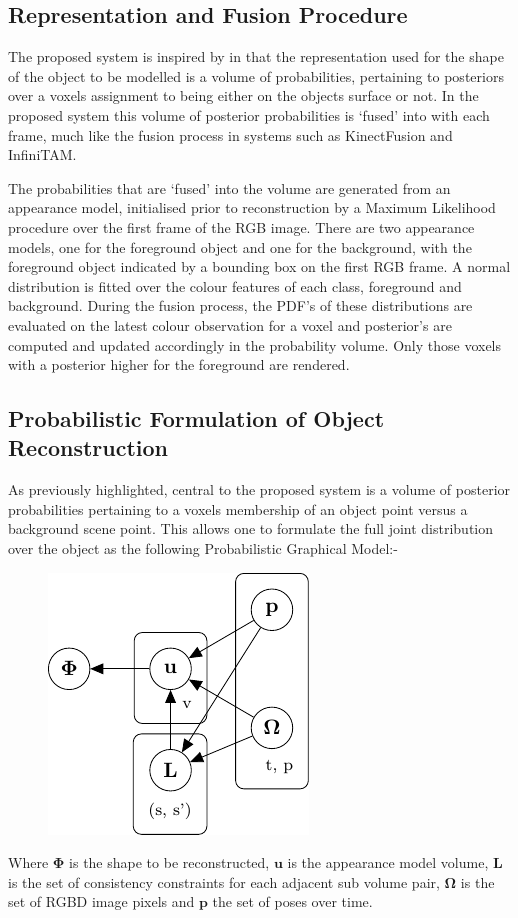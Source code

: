 \subsection{Representation and Fusion Procedure}
The proposed system is inspired by\cite{Kolev2006} in that the representation used for the shape of the object to be modelled is a volume 
of probabilities, pertaining to posteriors over a voxels assignment to being either on the objects surface or not. In the proposed system this 
volume of posterior probabilities is `fused' into with each frame, much like the fusion process in systems such as KinectFusion\cite{Newcombe2011} 
and InfiniTAM\cite{Prisacariu2014}.

The probabilities that are `fused' into the volume are generated from an appearance model, initialised prior to reconstruction by a Maximum 
Likelihood procedure over the first frame of the RGB image. There are two appearance models, one for the foreground object and one for 
the background, with the foreground object indicated by a bounding box on the first RGB frame. A normal distribution is fitted over the colour 
features of each class, foreground and background. During the fusion process, the PDF's of these distributions are evaluated on the latest 
colour observation for a voxel and posterior's are computed and updated accordingly in the probability volume. Only those voxels with a 
posterior higher for the foreground are rendered.

\subsection{Probabilistic Formulation of Object Reconstruction}
As previously highlighted, central to the proposed system is a volume of posterior probabilities pertaining to a voxels membership of an object 
point versus a background scene point. This allows one to formulate the full joint distribution over the object as the following Probabilistic 
Graphical Model:-
\begin{figure}[h]
	\centering
	\includegraphics{graphical_models/pgm1.pdf}
\end{figure}
Where $\mathbf{\Phi}$ is the shape to be reconstructed, $\mathbf{u}$ is the appearance model volume, $\mathbf{L}$ is the 
set of consistency constraints for each adjacent sub volume pair, $\mathbf{\Omega}$ is the set of RGBD image pixels and $\mathbf{p}$ the 
set of poses over time.

